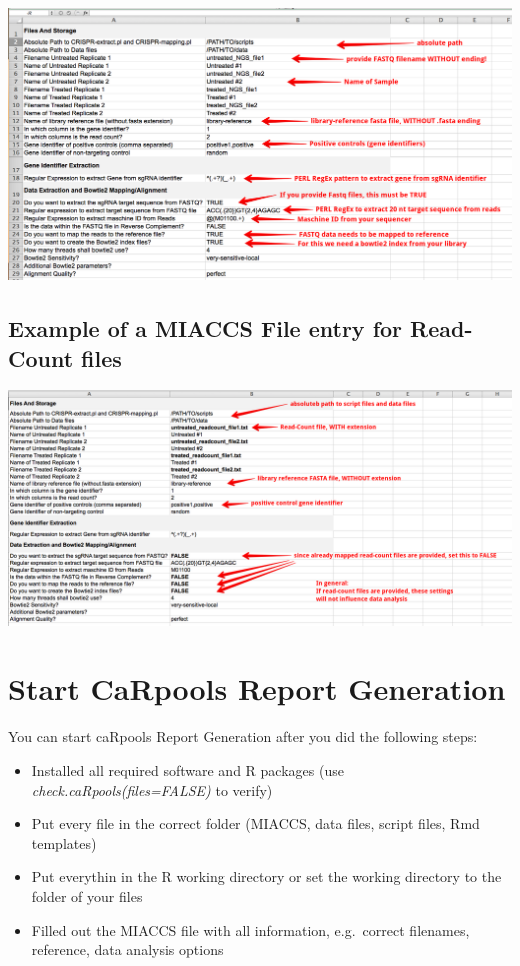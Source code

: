 \documentclass[]{article}
\providecommand{\tightlist}{%
  \setlength{\itemsep}{0pt}\setlength{\parskip}{0pt}}
\begin{document}
\includegraphics{./pictures/miaccs-fastq.png}

\subsection{Example of a MIACCS File entry for Read-Count
files}\label{example-of-a-miaccs-file-entry-for-read-count-files}

\includegraphics{./pictures/miaccs-readcount.png}

\section{Start CaRpools Report
Generation}\label{start-carpools-report-generation}

You can start caRpools Report Generation after you did the following
steps:

\begin{itemize}
\tightlist
\item
  Installed all required software and R packages (use
  \emph{check.caRpools(files=FALSE)} to verify)
\item
  Put every file in the correct folder (MIACCS, data files, script
  files, Rmd templates)
\item
  Put everythin in the R working directory or set the working directory
  to the folder of your files
\item
  Filled out the MIACCS file with all information, e.g.~correct
  filenames, reference, data analysis options
\end{itemize}
\end{document}

